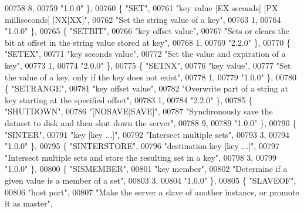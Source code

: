 \begin{DoxyCode}
00758     8,
00759     \textcolor{stringliteral}{"1.0.0"} \},
00760     \{ \textcolor{stringliteral}{"SET"},
00761     \textcolor{stringliteral}{"key value [EX seconds] [PX milliseconds] [NX|XX]"},
00762     \textcolor{stringliteral}{"Set the string value of a key"},
00763     1,
00764     \textcolor{stringliteral}{"1.0.0"} \},
00765     \{ \textcolor{stringliteral}{"SETBIT"},
00766     \textcolor{stringliteral}{"key offset value"},
00767     \textcolor{stringliteral}{"Sets or clears the bit at offset in the string value stored at key"},
00768     1,
00769     \textcolor{stringliteral}{"2.2.0"} \},
00770     \{ \textcolor{stringliteral}{"SETEX"},
00771     \textcolor{stringliteral}{"key seconds value"},
00772     \textcolor{stringliteral}{"Set the value and expiration of a key"},
00773     1,
00774     \textcolor{stringliteral}{"2.0.0"} \},
00775     \{ \textcolor{stringliteral}{"SETNX"},
00776     \textcolor{stringliteral}{"key value"},
00777     \textcolor{stringliteral}{"Set the value of a key, only if the key does not exist"},
00778     1,
00779     \textcolor{stringliteral}{"1.0.0"} \},
00780     \{ \textcolor{stringliteral}{"SETRANGE"},
00781     \textcolor{stringliteral}{"key offset value"},
00782     \textcolor{stringliteral}{"Overwrite part of a string at key starting at the specified offset"},
00783     1,
00784     \textcolor{stringliteral}{"2.2.0"} \},
00785     \{ \textcolor{stringliteral}{"SHUTDOWN"},
00786     \textcolor{stringliteral}{"[NOSAVE|SAVE]"},
00787     \textcolor{stringliteral}{"Synchronously save the dataset to disk and then shut down the server"},
00788     9,
00789     \textcolor{stringliteral}{"1.0.0"} \},
00790     \{ \textcolor{stringliteral}{"SINTER"},
00791     \textcolor{stringliteral}{"key [key ...]"},
00792     \textcolor{stringliteral}{"Intersect multiple sets"},
00793     3,
00794     \textcolor{stringliteral}{"1.0.0"} \},
00795     \{ \textcolor{stringliteral}{"SINTERSTORE"},
00796     \textcolor{stringliteral}{"destination key [key ...]"},
00797     \textcolor{stringliteral}{"Intersect multiple sets and store the resulting set in a key"},
00798     3,
00799     \textcolor{stringliteral}{"1.0.0"} \},
00800     \{ \textcolor{stringliteral}{"SISMEMBER"},
00801     \textcolor{stringliteral}{"key member"},
00802     \textcolor{stringliteral}{"Determine if a given value is a member of a set"},
00803     3,
00804     \textcolor{stringliteral}{"1.0.0"} \},
00805     \{ \textcolor{stringliteral}{"SLAVEOF"},
00806     \textcolor{stringliteral}{"host port"},
00807     \textcolor{stringliteral}{"Make the server a slave of another instance, or promote it as master"},

\end{DoxyCode}
